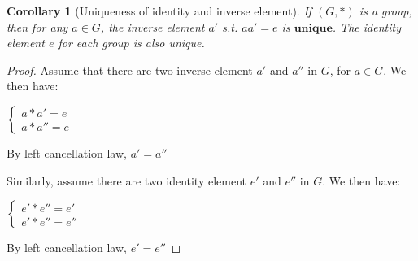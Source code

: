 \documentclass{article}
\theoremstyle{MyNonumberplain}
\theoremstyle{break}
\newtheorem*{proof}{Proof. }
\theoremstyle{break}
\newtheorem{corollary}{Corollary}[theorem]
\theoremstyle{break}
\theoremstyle{definition}
\theoremstyle{break}
\begin{document}
\begin{thmbox}
    \begin{corollary}[Uniqueness of identity and inverse element]
        If $(G,*)$ is a group, then for any $a\in G$, the inverse element $a'$ s.t. $aa'=e$ is $\mathbf{unique}$.\bigskip
        The identity element $e$ for each group is also unique.
    \end{corollary}
    \begin{prfbox}
        \begin{proof}
            Assume that there are two inverse element $a'$ and $a''$ in $G$, for $a\in G$. We then have:\bigskip
            \begin{center}
                $\left\{\begin{array}{l}
                    a \ast a' = e\\
                    a \ast a'' = e
                  \end{array}\right.$    
            \end{center}
            By left cancellation law, $a'=a''$\bigskip

            Similarly, assume there are two identity element $e'$ and $e''$ in $G$. We then have:\\
            \begin{center}
                $\left\{\begin{array}{l}
                    e' \ast e'' = e'\\
                    e' \ast e'' = e''
                  \end{array}\right.$
            \end{center}
            By left cancellation law, $e'=e''$
        \end{proof}
    \end{prfbox}
\end{thmbox}
\end{document}
